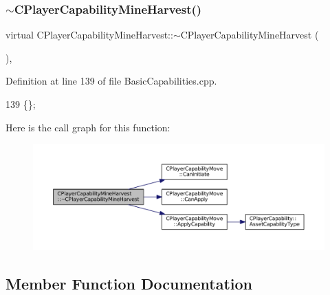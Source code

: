 \subsubsection{\texorpdfstring{$\sim$\+C\+Player\+Capability\+Mine\+Harvest()}{~CPlayerCapabilityMineHarvest()}}
{\footnotesize\ttfamily virtual C\+Player\+Capability\+Mine\+Harvest\+::$\sim$\+C\+Player\+Capability\+Mine\+Harvest (\begin{DoxyParamCaption}{ }\end{DoxyParamCaption})\hspace{0.3cm}{\ttfamily [inline]}, {\ttfamily [virtual]}}



Definition at line 139 of file Basic\+Capabilities.\+cpp.


\begin{DoxyCode}
139 \{\};
\end{DoxyCode}
Here is the call graph for this function\+:\nopagebreak
\begin{figure}[H]
\begin{center}
\leavevmode
\includegraphics[width=350pt]{classCPlayerCapabilityMineHarvest_aae786f3ba01e3f26359a38166af77ce5_cgraph}
\end{center}
\end{figure}


\subsection{Member Function Documentation}
\hypertarget{classCPlayerCapabilityMineHarvest_a76a72fe97148f5026e67aab24ab21b21}{}\label{classCPlayerCapabilityMineHarvest_a76a72fe97148f5026e67aab24ab21b21} 
